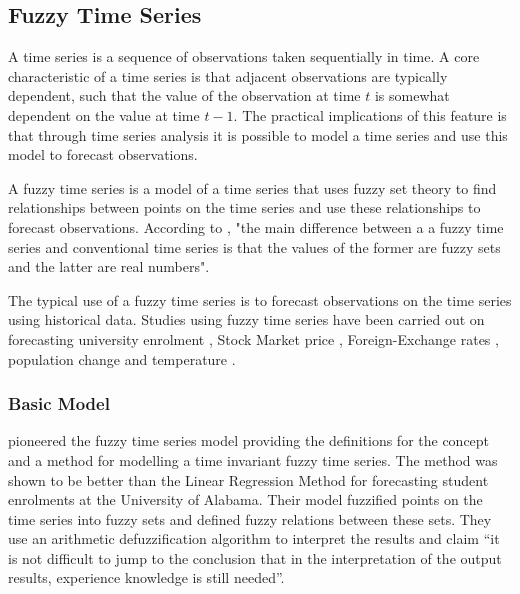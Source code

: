 \documentclass[12pt]{article}
\theoremstyle{definition}
\begin{document}
\label{fuzzysettheory}

\subsection{Fuzzy Time Series}

\label{fts}

A time series is a sequence of observations taken sequentially in time. A core characteristic of a time series is that adjacent observations are typically dependent, such that the value of the observation at time $t$ is somewhat dependent on the value at time $t-1$. The practical implications of this feature is that through time series analysis it is possible to model a time series and use this model to forecast observations.

A fuzzy time series is a model of a time series that uses fuzzy set theory to find relationships between points on the time series and use these relationships to forecast observations. According to \cite{chen1996forecasting}, "the main difference between a a fuzzy time series and conventional time series is that the values of the former are fuzzy sets and the latter are real numbers".

The typical use of a fuzzy time series is to forecast observations on the time series using historical data. Studies using fuzzy time series have been carried out on forecasting university enrolment \citep{song1993forecasting, song1994forecasting, chen1996forecasting, tsai2000forecasting, chen2004new, cheng2006trend, lee2006pattern, huarng2006ratio, tsaur2012fuzzy}, Stock Market price \citep{huarng2005type, cheng2006trend, lee2006pattern, huarng2006ratio, Chen2007fib, chu2009fuzzy}, Foreign-Exchange rates \citep{tsaur2012fuzzy}, population change \citep{tsai1999study} and temperature \citep{temperatureprediction2000, lee2006pattern}. 

\subsubsection{Basic Model}
\label{basic}
\cite{song1993forecasting} pioneered the fuzzy time series model providing the definitions for the concept and a method for modelling a time invariant fuzzy time series. The method was shown to be better than the Linear Regression Method for forecasting student enrolments at the University of Alabama. Their model fuzzified points on the time series into fuzzy sets and defined fuzzy relations between these sets. They use an arithmetic defuzzification algorithm to interpret the results and claim ``it is not difficult to jump to the conclusion that in the interpretation of the output results, experience knowledge is still needed''.
 
\end{document}
